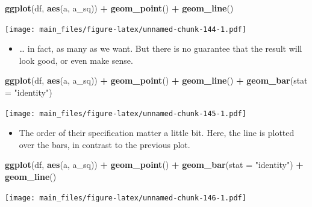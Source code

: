 \documentclass[
]{book}
\newenvironment{Shaded}{\begin{snugshade}}{\end{snugshade}}
\newcommand{\AttributeTok}[1]{\textcolor[rgb]{0.13,0.29,0.53}{#1}}
\newcommand{\FunctionTok}[1]{\textcolor[rgb]{0.13,0.29,0.53}{\textbf{#1}}}
\newcommand{\NormalTok}[1]{#1}
\newcommand{\SpecialCharTok}[1]{\textcolor[rgb]{0.81,0.36,0.00}{\textbf{#1}}}
\newcommand{\StringTok}[1]{\textcolor[rgb]{0.31,0.60,0.02}{#1}}
\providecommand{\tightlist}{%
  \setlength{\itemsep}{0pt}\setlength{\parskip}{0pt}}
\begin{document}
\begin{Shaded}
\begin{Highlighting}[]
\FunctionTok{ggplot}\NormalTok{(df, }\FunctionTok{aes}\NormalTok{(a, a\_sq)) }\SpecialCharTok{+} \FunctionTok{geom\_point}\NormalTok{() }\SpecialCharTok{+} \FunctionTok{geom\_line}\NormalTok{()}
\end{Highlighting}
\end{Shaded}

\texttt{[image: main\_files/figure-latex/unnamed-chunk-144-1.pdf]}

\begin{itemize}
\tightlist
\item
  \ldots{} in fact, as many as we want. But there is no guarantee that the result will look good, or even make sense.
\end{itemize}

\begin{Shaded}
\begin{Highlighting}[]
\FunctionTok{ggplot}\NormalTok{(df, }\FunctionTok{aes}\NormalTok{(a, a\_sq)) }\SpecialCharTok{+} \FunctionTok{geom\_point}\NormalTok{() }\SpecialCharTok{+} \FunctionTok{geom\_line}\NormalTok{() }\SpecialCharTok{+} \FunctionTok{geom\_bar}\NormalTok{(}\AttributeTok{stat =} \StringTok{"identity"}\NormalTok{)}
\end{Highlighting}
\end{Shaded}

\texttt{[image: main\_files/figure-latex/unnamed-chunk-145-1.pdf]}

\begin{itemize}
\tightlist
\item
  The order of their specification matter a little bit. Here, the line is plotted over the bars, in contrast to the previous plot.
\end{itemize}

\begin{Shaded}
\begin{Highlighting}[]
\FunctionTok{ggplot}\NormalTok{(df, }\FunctionTok{aes}\NormalTok{(a, a\_sq)) }\SpecialCharTok{+} \FunctionTok{geom\_point}\NormalTok{() }\SpecialCharTok{+} \FunctionTok{geom\_bar}\NormalTok{(}\AttributeTok{stat =} \StringTok{"identity"}\NormalTok{) }\SpecialCharTok{+} \FunctionTok{geom\_line}\NormalTok{()}
\end{Highlighting}
\end{Shaded}

\texttt{[image: main\_files/figure-latex/unnamed-chunk-146-1.pdf]}
\end{document}
